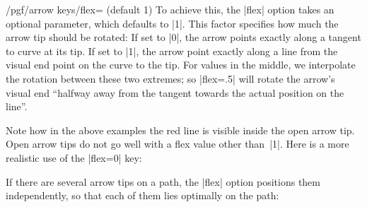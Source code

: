 \begin{key}{/pgf/arrow keys/flex= (default 1)}
    To achieve this, the |flex| option takes an optional 
    parameter, which defaults to |1|. This factor specifies how much the arrow
    tip should be rotated: If set to |0|, the arrow points exactly along a
    tangent to curve at its tip. If set to |1|, the arrow point exactly along a
    line from the visual end point on the curve to the tip. For values in the
    middle, we interpolate the rotation between these two extremes; so
    |flex=.5| will rotate the arrow's visual end ``halfway away from the
    tangent towards the actual position on the line''.
\begin{codeexample}[]
\end{codeexample}
\begin{codeexample}[]
\end{codeexample}
    Note how in the above examples the red line is visible inside the open
    arrow tip. Open arrow tips do not go well with a flex value other than~|1|.
    Here is a more realistic use of the |flex=0| key:
\begin{codeexample}[]
\end{codeexample}
    If there are several arrow tips on a path, the |flex| option positions them
    independently, so that each of them lies optimally on the path:
\begin{codeexample}[]
\end{codeexample}
\end{key}

